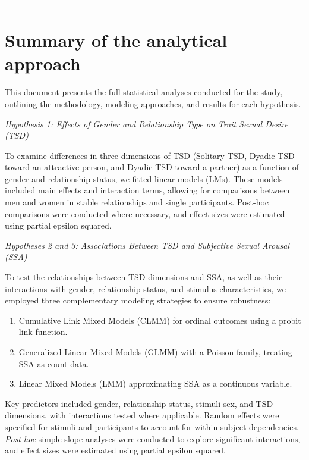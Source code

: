 \documentclass[
  bookmarksnumbered]{article}
\providecommand{\tightlist}{%
  \setlength{\itemsep}{0pt}\setlength{\parskip}{0pt}}
\begin{document}
\begin{center}\rule{0.5\linewidth}{0.5pt}\end{center}

\section{Summary of the analytical approach}\label{summary-of-the-analytical-approach}

This document presents the full statistical analyses conducted for the study, outlining the methodology, modeling approaches, and results for each hypothesis.

\emph{Hypothesis 1: Effects of Gender and Relationship Type on Trait Sexual Desire (TSD)}

To examine differences in three dimensions of TSD (Solitary TSD, Dyadic TSD toward an attractive person, and Dyadic TSD toward a partner) as a function of gender and relationship status, we fitted linear models (LMs). These models included main effects and interaction terms, allowing for comparisons between men and women in stable relationships and single participants. Post-hoc comparisons were conducted where necessary, and effect sizes were estimated using partial epsilon squared.

\emph{Hypotheses 2 and 3: Associations Between TSD and Subjective Sexual Arousal (SSA)}

To test the relationships between TSD dimensions and SSA, as well as their interactions with gender, relationship status, and stimulus characteristics, we employed three complementary modeling strategies to ensure robustness:

\begin{enumerate}
\def\labelenumi{\arabic{enumi}.}
\tightlist
\item
  Cumulative Link Mixed Models (CLMM) for ordinal outcomes using a probit link function.
\item
  Generalized Linear Mixed Models (GLMM) with a Poisson family, treating SSA as count data.
\item
  Linear Mixed Models (LMM) approximating SSA as a continuous variable.
\end{enumerate}

Key predictors included gender, relationship status, stimuli sex, and TSD dimensions, with interactions tested where applicable. Random effects were specified for stimuli and participants to account for within-subject dependencies. \emph{Post-hoc} simple slope analyses were conducted to explore significant interactions, and effect sizes were estimated using partial epsilon squared.
\end{document}
